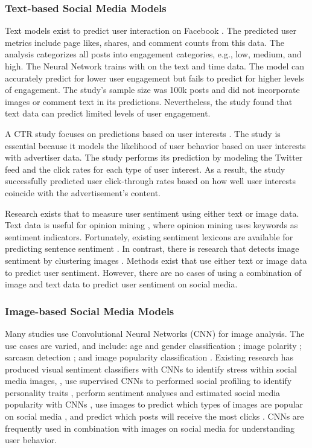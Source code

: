 \documentclass{article}
\begin{document}
\subsubsection{Text-based Social Media Models}
Text models exist to predict user interaction on Facebook \cite{8029313}. The predicted user metrics include page likes, shares, and comment counts from this data. The analysis categorizes all posts into engagement categories, e.g., low, medium, and high.  The Neural Network trains with on the text and time data. The model can accurately predict for lower user engagement but fails to predict for higher levels of engagement. The study's sample size was 100k posts and did not incorporate images or comment text in its predictions. Nevertheless, the study found that text data can predict limited levels of user engagement.

A CTR study focuses on predictions based on user interests \cite{Li2015}. The study is essential because it models the likelihood of user behavior based on user interests with advertiser data.  The study performs its prediction by modeling the Twitter feed and the click rates for each type of user interest. As a result, the study successfully predicted user click-through rates based on how well user interests coincide with the advertisement's content.

Research exists that to measure user sentiment using either text or image data. Text data is useful for opinion mining \cite{Liu2012}, where opinion mining uses keywords as sentiment indicators. Fortunately, existing sentiment lexicons are available for predicting sentence sentiment \cite{Georgiou2015}. In contrast, there is research that detects image sentiment by clustering images \cite{Wang2015}. Methods exist that use either text or image data to predict user sentiment. However, there are no cases of using a combination of image and text data to predict user sentiment on social media.

\subsubsection{Image-based Social Media Models}
Many studies use Convolutional Neural Networks (CNN) for image analysis. The use cases are varied, and include: age and gender classification \cite{Hassner2015}; image polarity \cite{Poria2016}; sarcasm detection \cite{Poria2016}; and image popularity classification \cite{Khosla2014}. Existing research has produced visual sentiment classifiers with CNNs \cite{Segalin2017,Xu2014} to identify stress within social media images, \cite{Lin2014}, use supervised CNNs to performed social profiling to identify personality traits \cite{Segalin2017}, perform sentiment analyses and estimated social media popularity with CNNs \cite{Gelli2015}, use images to predict which types of images are popular on social media \cite{Gelli2015}, and predict which posts will receive the most clicks \cite{Khosla2014}. CNNs are frequently used in combination with images on social media for understanding user behavior.
\end{document}
